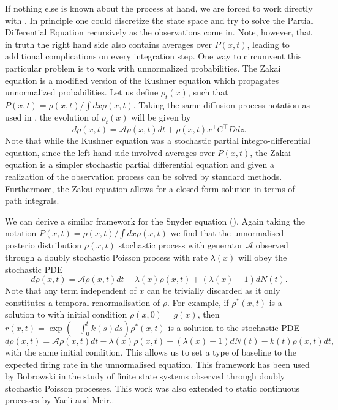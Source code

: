 If nothing else is known about the process at hand, we are forced to work directly with . In principle one could discretize the state space and try to solve the Partial Differential Equation recursively as the observations come in. Note, however, that in truth the right hand side  also contains averages over $P(x,t)$, leading to additional complications on every integration step. One way to circumvent this particular problem is to work with unnormalized probabilities. The Zakai equation\cite{Zakai1969} is a modified version of the Kushner equation which propagates unnormalized probabilities. Let us define $\rho_t(x)$, such that $P(x,t) = \rho(x,t)/\int dx \rho(x,t)$. Taking the same diffusion process notation as used in , the evolution of $\rho_t(x)$ will be given by
\begin{equation}
\label{eq:zakai}
d\rho(x,t) = \mathcal{A} \rho(x,t) dt+ \rho(x,t) x^\top C^\top D dz.
\end{equation}
Note that while the Kushner equation was a stochastic partial integro-differential equation, since the left hand side involved averages over $P(x,t)$, the Zakai equation is a simpler stochastic partial differential equation and given a realization of the observation process can be solved by standard methods. Furthermore, the Zakai equation allows for a closed form solution in terms of path integrals.\par
We can derive a similar framework for the Snyder equation (). Again taking the notation $P(x,t) = \rho(x,t) / \int dx \rho(x,t)$ we find that the 
unnormalised posterio distribution $\rho(x,t)$ stochastic process with generator $\mathcal{A}$ observed through a doubly stochastic Poisson process with rate 
$\lambda(x)$ will obey the stochastic PDE
\begin{equation}
\label{eq:zakai_snyder}
d\rho(x,t) = \mathcal{A} \rho(x,t) dt -\lambda(x) \rho(x,t) + \left(\lambda(x) -1 \right)dN(t).
\end{equation}
Note that any term independent of $x$ can be trivially discarded as it only constitutes a temporal renormalisation of $\rho$. For example, if $\rho^*(x,t)$ is a solution to
 with initial condition $\rho(x,0) = g(x)$, then $r(x,t) = \exp(-\int_0^t k(s) ds ) \rho^*(x,t)$ is a solution to the stochastic PDE
\[
d\rho(x,t) = \mathcal{A} \rho(x,t) dt -\lambda(x) \rho(x,t) + \left(\lambda(x) -1 \right)dN(t) -k(t) \rho(x,t) dt,
\]
with the same initial condition.
This allows us to set a type of baseline to the expected firing rate in the unnormalised equation. This framework has been used by Bobrowski\cite{Bobrowski2009} in
the study of finite state systems observed through doubly stochastic Poisson processes. This work was also extended to static continuous processes by 
Yaeli and Meir.\cite{Yaeli2010}.

